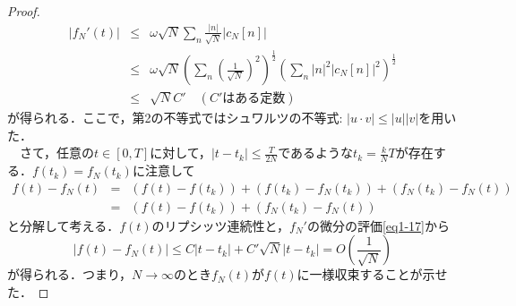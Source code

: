 \documentclass[a4j]{jsbook}
\numberwithin{theorem}{chapter}  %
\begin{document}
\begin{proof}
\begin{eqnarray}
|f_N'(t)|&\leq&\omega\sqrt{N}\sum_{n}\frac{|n|}{\sqrt{N}}|c_N[n]| \nonumber \\
&\leq&\omega\sqrt{N}\left(\sum_{n}\left(\frac{1}{\sqrt{N}}\right)^2\right)^{\frac{1}{2}}\left(\sum_{n}|n|^2|c_N[n]|^2\right)^{\frac{1}{2}} \nonumber \\
&\leq&\sqrt{N}C'\quad (C'\mbox{はある定数}) \label{eq1-17}
\end{eqnarray}
が得られる．ここで，第2の不等式ではシュワルツの不等式: \(|u\cdot v|\leq|u||v|\)を用いた．\\
　さて，任意の\(t\in[0, T]\)に対して，\(\displaystyle |t-t_k|\leq\frac{T}{2N}\)であるような\(\displaystyle t_k=\frac{k}{N}T\)が存在する．\(f(t_k)=f_N(t_k)\)に注意して
\begin{eqnarray*}
f(t)-f_N(t)&=&(f(t)-f(t_k))+(f(t_k)-f_N(t_k))+(f_N(t_k)-f_N(t)) \\
&=&(f(t)-f(t_k))+(f_N(t_k)-f_N(t))
\end{eqnarray*}
と分解して考える．\(f(t)\)のリプシッツ連続性と，\(f_N'\)の微分の評価\eqref{eq1-17}から
\begin{equation*}
    |f(t)-f_N(t)|\leq C|t-t_k|+C'\sqrt{N}|t-t_k|=O\left(\frac{1}{\sqrt{N}}\right)
\end{equation*}
が得られる．つまり，\(N\to\infty\)のとき\(f_N(t)\)が\(f(t)\)に一様収束することが示せた．
\end{proof}
\end{document}
